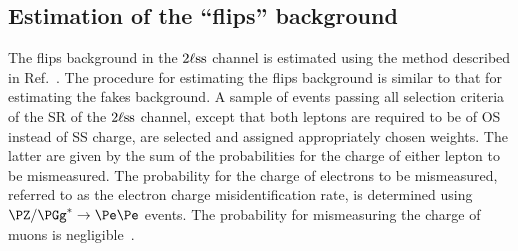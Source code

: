 \subsection{Estimation of the ``flips'' background}
\label{sec:backgroundEstimation_flips}

The flips background in the $2\ell\text{ss}$ channel is estimated using the method described in Ref.~\cite{Sirunyan:2020icl}.
The procedure for estimating the flips background is similar to that for estimating the fakes background.
A sample of events passing all selection criteria of the SR of the $2\ell\text{ss}$ channel, 
except that both leptons are required to be of OS instead of SS charge, 
are selected and assigned appropriately chosen weights.
The latter are given by the sum of the probabilities for the charge of either lepton to be mismeasured.
The probability for the charge of electrons to be mismeasured, referred to as the electron charge misidentification rate,
is determined using $\Zee$ events.
The probability for mismeasuring the charge of muons is negligible~\cite{Sirunyan:2020icl}.
